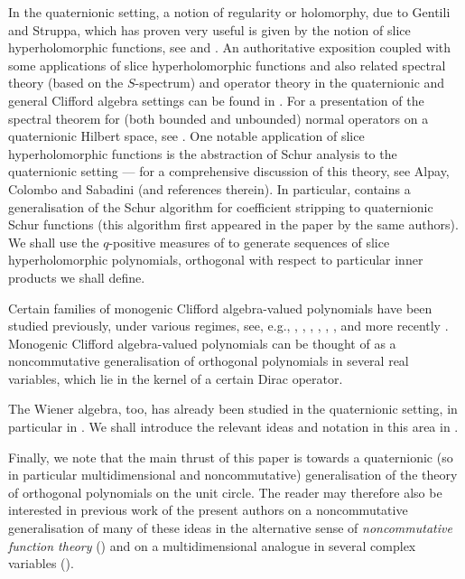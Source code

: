 \documentclass[11pt,reqno]{amsart}
\theoremstyle{definition}
\numberwithin{equation}{section}
\begin{document}
In the quaternionic setting, a notion of regularity or holomorphy, due to Gentili and Struppa, which has proven very useful is given by the notion of slice hyperholomorphic functions, see \cite{GP06} and \cite{GP07}. An authoritative exposition coupled with some applications of slice hyperholomorphic functions and also related spectral theory (based on the $S$-spectrum) and operator theory in the quaternionic and general Clifford algebra settings can be found in \cite{CSS11}. For a presentation of the spectral theorem for (both bounded and unbounded) normal operators on a quaternionic Hilbert space, see \cite{CGK18}. One notable application of slice hyperholomorphic functions is the abstraction of Schur analysis to the quaternionic setting --- for a comprehensive discussion of this theory, see Alpay, Colombo and Sabadini \cite{ACS16a} (and references therein). In particular, \cite{ACS16a} contains a generalisation of the Schur algorithm for coefficient stripping to quaternionic Schur functions (this algorithm first appeared in the paper \cite{ACS16b} by the same authors). We shall use the \(q\)-positive measures of \cite{ACKS15} to generate sequences of slice hyperholomorphic polynomials, orthogonal with respect to particular inner products we shall define.

Certain families of monogenic Clifford algebra-valued polynomials have been studied previously, under various regimes, see, e.g., \cite{CGM01}, \cite{BCG04}, \cite{BCG06}, \cite{BG10}, \cite{BGLS12}, \cite{CFM14}, \cite{CFM17} and more recently \cite{BSZ25}. Monogenic Clifford algebra-valued polynomials can be thought of as a noncommutative generalisation of orthogonal polynomials in several real variables, which lie in the kernel of a certain Dirac operator.

The Wiener algebra, too, has already been studied in the quaternionic setting, in particular in \cite{ACKS16}. We shall introduce the relevant ideas and notation in this area in .

Finally, we note that the main thrust of this paper is towards a quaternionic (so in particular multidimensional and noncommutative) generalisation of the theory of orthogonal polynomials on the unit circle. The reader may therefore also be interested in previous work of the present authors on a noncommutative generalisation of many of these ideas in the alternative sense of \emph{noncommutative function theory} (\cite{GK25a}) and on a multidimensional analogue in several complex variables (\cite{GK25b}).
\end{document}
